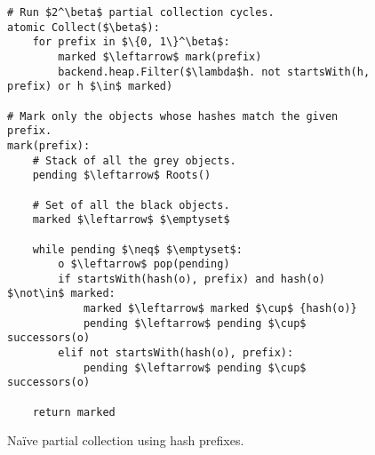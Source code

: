 \begin{figure}[!ht]
  \caption{Naïve partial collection using hash prefixes.}
  \label{alg:partial-prefix}

  \centering
  \begin{lstlisting}
# Run $2^\beta$ partial collection cycles.
atomic Collect($\beta$):
    for prefix in $\{0, 1\}^\beta$:
        marked $\leftarrow$ mark(prefix)
        backend.heap.Filter($\lambda$h. not startsWith(h, prefix) or h $\in$ marked)

# Mark only the objects whose hashes match the given prefix.
mark(prefix):
    # Stack of all the grey objects.
    pending $\leftarrow$ Roots()

    # Set of all the black objects.
    marked $\leftarrow$ $\emptyset$

    while pending $\neq$ $\emptyset$:
        o $\leftarrow$ pop(pending)
        if startsWith(hash(o), prefix) and hash(o) $\not\in$ marked:
            marked $\leftarrow$ marked $\cup$ {hash(o)}
            pending $\leftarrow$ pending $\cup$ successors(o)
        elif not startsWith(hash(o), prefix):
            pending $\leftarrow$ pending $\cup$ successors(o)

    return marked
\end{lstlisting}
\end{figure}
